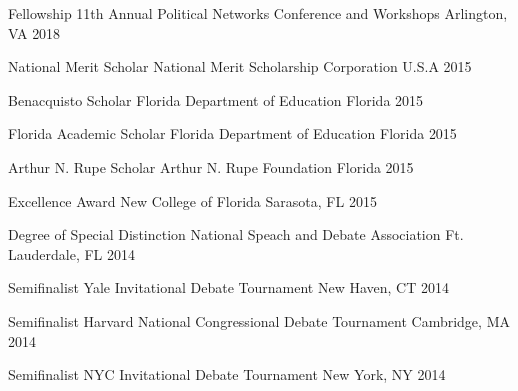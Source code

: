 

\begin{cvhonors}

  \cvhonor
    {Fellowship} %
    {11th Annual Political Networks Conference and Workshops} %
    {Arlington, VA} %
    {2018} %

  \cvhonor
    {National Merit Scholar} %
    {National Merit Scholarship Corporation} %
    {U.S.A} %
    {2015} %

  \cvhonor
    {Benacquisto Scholar} %
    {Florida Department of Education} %
    {Florida} %
    {2015} %

  \cvhonor
    {Florida Academic Scholar} %
    {Florida Department of Education} %
    {Florida} %
    {2015} %

  \cvhonor
    {Arthur N. Rupe Scholar} %
    {Arthur N. Rupe Foundation} %
    {Florida} %
    {2015} %

  \cvhonor
    {Excellence Award} %
    {New College of Florida} %
    {Sarasota, FL} %
    {2015} %

  \cvhonor
    {Degree of Special Distinction} %
    {National Speach and Debate Association} %
    {Ft. Lauderdale, FL} %
    {2014} %

  \cvhonor
    {Semifinalist} %
    {Yale Invitational Debate Tournament} %
    {New Haven, CT} %
    {2014} %

  \cvhonor
    {Semifinalist} %
    {Harvard National Congressional Debate Tournament} %
    {Cambridge, MA} %
    {2014} %

  \cvhonor
    {Semifinalist} %
    {NYC Invitational Debate Tournament} %
    {New York, NY} %
    {2014} %



\end{cvhonors}
